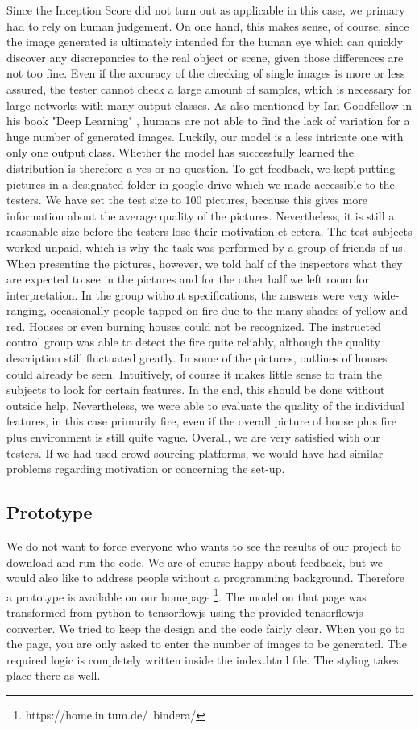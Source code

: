     Since the Inception Score did not turn out as applicable in this case, we primary had to rely on human judgement. On one hand, this makes sense, of course, since the image generated is ultimately intended for the human eye which can quickly discover any discrepancies to the real object or scene, given those differences are not too fine. Even if the accuracy of the checking of single images is more or less assured, the tester cannot check a large amount of samples, which is necessary for large networks with many output classes. As also mentioned by Ian Goodfellow in his book "Deep Learning" \cite{Goodfellow-et-al-2016}, humans are not able to find the lack of variation for a huge number of generated images. Luckily, our model is a less intricate one with only one output class. Whether the model has successfully learned the distribution is therefore a yes or no question. To get feedback, we kept putting pictures in a designated folder in google drive which we made accessible to the testers. We have set the test size to 100 pictures, because this gives more information about the average quality of the pictures. Nevertheless, it is still a reasonable size before the testers lose their motivation et cetera. The test subjects worked unpaid, which is why the task was performed by a group of friends of us. When presenting the pictures, however, we told half of the inspectors what they are expected to see in the pictures and for the other half we left room for interpretation. In the group without specifications, the answers were very wide-ranging, occasionally people tapped on fire due to the many shades of yellow and red. Houses or even burning houses could not be recognized. The instructed control group was able to detect the fire quite reliably, although the quality description still fluctuated greatly. In some of the pictures, outlines of houses could already be seen. Intuitively, of course it makes little sense to train the subjects to look for certain features. In the end, this should be done without outside help. Nevertheless, we were able to evaluate the quality of the individual features, in this case primarily fire, even if the overall picture of house plus fire plus environment is still quite vague. Overall, we are very satisfied with our testers. If we had used crowd-sourcing platforms, we would have had similar problems regarding motivation or concerning the set-up.

    \subsection{Prototype}
    We do not want to force everyone who wants to see the results of our project to download and run the code. We are of course happy about feedback, but we would also like to address people without a programming background. Therefore a prototype is available on our homepage \footnote{https://home.in.tum.de/~bindera/}. The model on that page was transformed from python to tensorflowjs using the provided tensorflowjs converter. We tried to keep the design and the code fairly clear. When you go to the page, you are only asked to enter the number of images to be generated. The required logic is completely written inside the index.html file. The styling takes place there as well.

